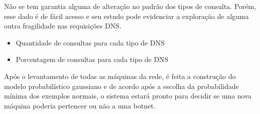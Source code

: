 Não se tem garantia alguma de alteração no padrão dos tipos de consulta. Porém, esse dado é de fácil acesso e seu estudo pode evidenciar a exploração de alguma outra fragilidade nas requisições DNS.

\begin{itemize}
\item Quantidade de consultas para cada tipo de DNS
\item Porcentagem de consultas para cada tipo de DNS
\end{itemize}

Após o levantamento de todas as máquinas da rede, é feita a construção do modelo probabilístico gaussiano e de acordo após a escolha da probabilidade mínima dos exemplos normais, o sistema estará pronto para decidir se uma nova máquina poderia pertencer ou não a uma botnet.
